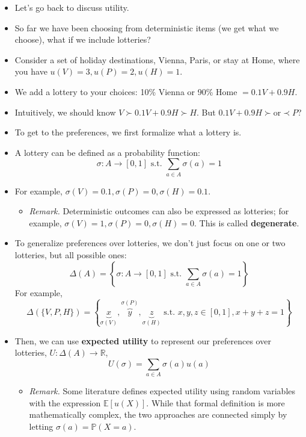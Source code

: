 \documentclass[notitlepage]{article}
\begin{document}
\begin{itemize}
    \item Let's go back to discuss utility.
    \item So far we have been choosing from deterministic items (we get what we choose), what if we include lotteries?
    \item Consider a set of holiday destinations, Vienna, Paris, or stay at Home, where you have \(u(V) = 3, u(P) = 2, u(H) = 1\).
    \item We add a lottery to your choices: 10\% Vienna or 90\% Home \(= 0.1V + 0.9H\).
    \item Intuitively, we should know \(V \succ 0.1V + 0.9H \succ H\). But \(0.1V + 0.9H \succ \text{or} \prec P\)?
    \item To get to the preferences, we first formalize what a lottery is.
    \item A lottery can be defined as a probability function:
    \[
    \sigma: A \to [0,1] \text{ s.t. } \sum_{a \in A}\sigma(a) = 1
    \]
    \item For example, \(\sigma(V) = 0.1, \sigma(P) = 0, \sigma(H) = 0.1\).
    \begin{itemize}
        \item \textit{Remark.} Deterministic outcomes can also be expressed as lotteries; for example, \(\sigma(V) = 1, \sigma(P) = 0, \sigma(H) = 0\). This is called \textbf{degenerate}.
    \end{itemize}
    \item To generalize preferences over lotteries, we don't just focus on one or two lotteries, but all possible ones:
    \[
    \Delta(A) = \left\{\sigma:A \to [0,1] \text{ s.t. } \sum_{a \in A}\sigma(a) = 1\right\}
    \]
    For example,
    \[
    \Delta(\{V, P, H\}) = \left\{\underbrace{x}_{\sigma(V)},\overbrace{y}^{\sigma(P)},\underbrace{z}_{\sigma(H)} \text{ s.t. } x,y,z \in [0,1], x+y+z=1 \right\}
    \]
    \item Then, we can use \textbf{expected utility} to represent our preferences over lotteries, \(U: \Delta(A) \to \mathbb{R}\),
    \[
    U(\sigma) = \sum_{a \in A}\sigma(a)u(a)
    \]
    \begin{itemize}
        \item \textit{Remark.} Some literature defines expected utility using random variables with the expression \(\mathbb{E}[u(X)]\). While that formal definition is more mathematically complex, the two approaches are connected simply by letting \(\sigma(a) = \mathbb{P}(X = a)\).
    \end{itemize}

\end{itemize}
\end{document}
